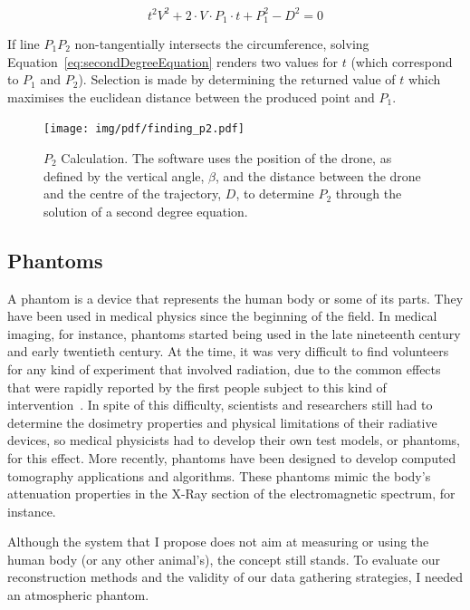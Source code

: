 \begin{equation}
    \label{eq:secondDegreeEquation}
    t^2V^2 + 2 \cdot V \cdot P_1 \cdot t + P_{1}^2 - D^2 = 0
\end{equation}

If line $P_1P_2$ non-tangentially intersects the circumference, solving
Equation~\ref{eq:secondDegreeEquation} renders two values for $t$ (which
correspond to $P_1$ and $P_2$). Selection is made by determining the
returned value of $t$ which maximises the euclidean distance between the
produced point and $P_1$.


\begin{figure}[htb]
    \centering
    \texttt{[image: img/pdf/finding\_p2.pdf]}
    \caption{$P_2$ Calculation. The software uses the position of the
    drone, as defined by the vertical angle, $\beta$, and the distance between
    the drone and the centre of the trajectory, $D$, to determine $P_2$
    through the solution of a second degree equation.}\label{fig:p2_calculation}
\end{figure}

\subsection{Phantoms}%
\label{sub:phantoms}

A phantom is a device that represents the human body or some of its
parts. They have been used in medical physics since the beginning of the
field. In medical imaging, for instance, phantoms started being used in
the late nineteenth century and early twentieth century. At the time, it
was very difficult to find volunteers for any kind of experiment that
involved radiation, due to the common effects that were rapidly reported
by the first people subject to this kind of
intervention~\cite{Dewerd2014}. In spite of this difficulty, scientists
and researchers still had to determine the dosimetry properties and
physical limitations of their radiative devices, so medical physicists
had to develop their own test models, or phantoms, for this effect. More
recently, phantoms have been designed to develop computed tomography
applications and algorithms. These phantoms mimic the body's attenuation
properties in the X-Ray section of the electromagnetic spectrum, for
instance.

Although the system that I propose does not aim at measuring or using
the human body (or any other animal's), the concept still stands. To
evaluate our reconstruction methods and the validity of our data
gathering strategies, I needed an atmospheric phantom.

